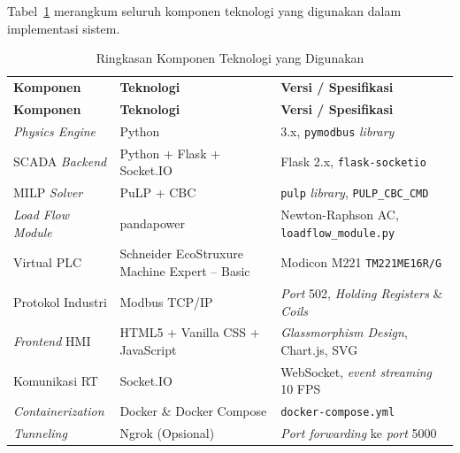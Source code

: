 Tabel~\ref{tab:teknologi} merangkum seluruh komponen teknologi yang digunakan dalam implementasi sistem.

\begin{longtable}{|p{3.2cm}|p{5.2cm}|p{5.0cm}|}
    \caption{Ringkasan Komponen Teknologi yang Digunakan}
    \label{tab:teknologi}
    \vspace{-0.75em}\\
    \hline
    \textbf{Komponen} & \textbf{Teknologi} & \textbf{Versi / Spesifikasi} \\ \hline
    \endfirsthead
    \hline
    \textbf{Komponen} & \textbf{Teknologi} & \textbf{Versi / Spesifikasi} \\ \hline
    \endhead
    
   \textit{Physics Engine}    & Python                               & 3.x, \texttt{pymodbus} \textit{library} \\ \hline
    SCADA \textit{Backend}     & Python + Flask + Socket.IO           & Flask 2.x, \texttt{flask-socketio} \\ \hline
    MILP \textit{Solver}       & PuLP + CBC                           & \texttt{pulp} \textit{library}, \texttt{PULP\_CBC\_CMD} \\ \hline
    \textit{Load Flow Module}  & pandapower                           & Newton-Raphson AC, \texttt{loadflow\_module.py} \\ \hline
    Virtual PLC       & Schneider EcoStruxure Machine Expert -- Basic & Modicon M221 \texttt{TM221ME16R/G} \\ \hline
    Protokol Industri & Modbus TCP/IP                        & \textit{Port} 502, \textit{Holding Registers} \& \textit{Coils} \\ \hline
    \textit{Frontend} HMI      & HTML5 + Vanilla CSS + JavaScript     & \textit{Glassmorphism Design}, Chart.js, SVG \\ \hline
    Komunikasi RT     & Socket.IO                            & WebSocket, \textit{event streaming} 10 FPS \\ \hline
    \textit{Containerization}  & Docker \& Docker Compose             & \texttt{docker-compose.yml} \\ \hline
    \textit{Tunneling}         & Ngrok (Opsional)                     & \textit{Port forwarding} ke \textit{port} 5000 \\ \hline
\end{longtable}